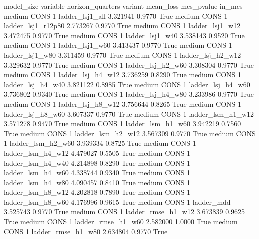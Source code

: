 model_size variable  horizon_quarters                variant  mean_loss  mcs_pvalue  in_mcs
    medium     CONS                 1        ladder_lsj1_all   3.321941      0.9770    True
    medium     CONS                 1     ladder_lsj1_r12p80   2.773267      0.9770    True
    medium     CONS                 1        ladder_lsj1_w12   3.472475      0.9770    True
    medium     CONS                 1        ladder_lsj1_w40   3.538143      0.9520    True
    medium     CONS                 1        ladder_lsj1_w60   3.413437      0.9770    True
    medium     CONS                 1        ladder_lsj1_w80   3.311459      0.9770    True
    medium     CONS                 1      ladder_lsj_h2_w12   3.329632      0.9770    True
    medium     CONS                 1      ladder_lsj_h2_w60   3.308304      0.9770    True
    medium     CONS                 1      ladder_lsj_h4_w12   3.736259      0.8290    True
    medium     CONS                 1      ladder_lsj_h4_w40   3.821122      0.8985    True
    medium     CONS                 1      ladder_lsj_h4_w60   3.736802      0.9340    True
    medium     CONS                 1      ladder_lsj_h4_w80   3.233986      0.9770    True
    medium     CONS                 1      ladder_lsj_h8_w12   3.756644      0.8265    True
    medium     CONS                 1      ladder_lsj_h8_w60   3.607337      0.9770    True
    medium     CONS                 1      ladder_lsm_h1_w12   3.571278      0.9470    True
    medium     CONS                 1      ladder_lsm_h1_w60   3.942219      0.7560    True
    medium     CONS                 1      ladder_lsm_h2_w12   3.567309      0.9770    True
    medium     CONS                 1      ladder_lsm_h2_w60   3.939334      0.8725    True
    medium     CONS                 1      ladder_lsm_h4_w12   4.479027      0.5505    True
    medium     CONS                 1      ladder_lsm_h4_w40   4.214898      0.8290    True
    medium     CONS                 1      ladder_lsm_h4_w60   4.338744      0.9340    True
    medium     CONS                 1      ladder_lsm_h4_w80   4.090457      0.8410    True
    medium     CONS                 1      ladder_lsm_h8_w12   4.202818      0.7890    True
    medium     CONS                 1      ladder_lsm_h8_w60   4.176996      0.9615    True
    medium     CONS                 1             ladder_mdd   3.525743      0.9770    True
    medium     CONS                 1     ladder_rmse_h1_w12   3.673839      0.9625    True
    medium     CONS                 1     ladder_rmse_h1_w60   2.582000      1.0000    True
    medium     CONS                 1     ladder_rmse_h1_w80   2.634804      0.9770    True

